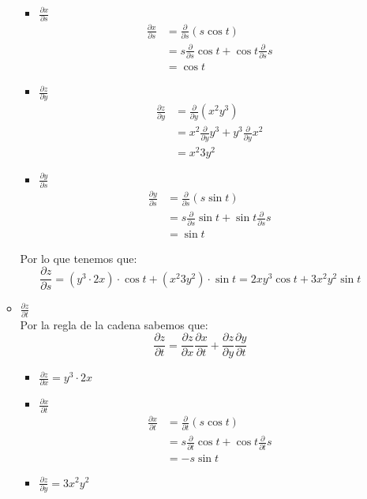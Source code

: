 \documentclass[12pt]{article}
\begin{document}
\begin{itemize}[format=\textbf]
\begin{itemize}
\begin{itemize}
   \item $\frac{\partial x}{\partial s}$
     \begin{align*}
       \frac{\partial x}{\partial s} &=\frac{\partial}{\partial s} \left( s \cos{t} \right) \\
       &= s \frac{\partial}{\partial s}  \cos{t} + \cos{t}\frac{\partial}{\partial s}s \\
       &=\cos{t}
     \end{align*}
   \item $ \frac{\partial z}{\partial y}$
     \begin{align*}
      \frac{\partial z}{\partial y}  &=\frac{\partial}{\partial y}  \left( x^2 y^3\right)  \\
       &= x^2 \frac{\partial}{\partial y}  y^3 + y^3 \frac{\partial}{\partial y}x^2 \\
       &=x^2  3y^2 
     \end{align*}


   \item $\frac{\partial y}{\partial s}$
     \begin{align*}
      \frac{\partial y}{\partial s}  &=\frac{\partial}{\partial s}  \left(s \sin{t} \right)  \\
       &= s \frac{\partial}{\partial s}  \sin{t}   +  \sin{t} \frac{\partial}{\partial s}s \\
       &= \sin{t}
     \end{align*}
  \end{itemize}
  Por lo que tenemos que:
   \[
\frac{\partial z}{\partial s} = (y^3  \cdot 2x) \cdot \cos{t} +(x^2  3y^2 ) \cdot  \sin{t} =  2xy^3\cos{t} +3x^2y^2   \sin{t}
  \]
\item  $\frac{\partial z}{\partial t}$ \\

  Por la regla de la cadena sabemos que:
  \[
\frac{\partial z}{\partial t} = \frac{\partial z}{\partial x} \frac{\partial x}{\partial t} + \frac{\partial z}{\partial y}\frac{\partial y}{\partial t}
\]

  \begin{itemize}
   \item  $\frac{\partial z}{\partial x} =  y^3  \cdot 2x$

   \item $\frac{\partial x}{\partial t}$
     \begin{align*}
       \frac{\partial x}{\partial t} &=\frac{\partial}{\partial t} \left( s \cos{t} \right) \\
       &= s \frac{\partial}{\partial t}  \cos{t} + \cos{t}\frac{\partial}{\partial t}s \\
       &=-s\sin{t}
     \end{align*}
   \item $ \frac{\partial z}{\partial y}=3x^2y^2$



\end{itemize}
\end{itemize}
\end{itemize}
\end{document}
